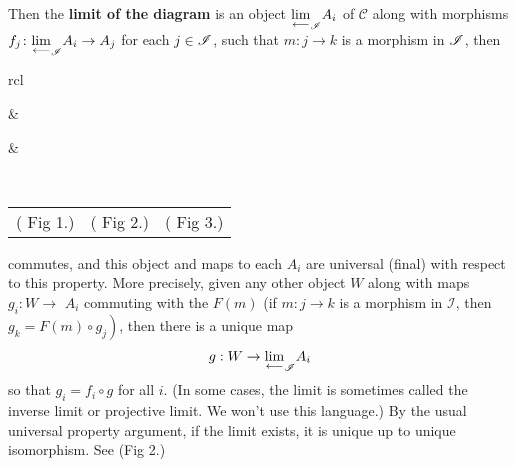 Then the \textbf{limit of the diagram} is an object ${\lim\limits_{\longleftarrow}}_{{\mathscr I}} A_i$ of $\mathscr{C}$ along with morphisms
$f_j\colon {\lim\limits_{\longleftarrow}}_{{\mathscr I}} A_i\to A_j$ for each $j\in {\mathscr I}$, such that $m\colon j\to k$ is a morphism in ${\mathscr I}$, then 
\begin{center}
\begin{tabular}{rcl}
&  
&
\end{tabular}\\
\begin{tabular}{p{.3\linewidth}<{\centering} p{.3\linewidth}<{\centering} p{.3\linewidth}<{\raggedright}}
( Fig 1.) & ( Fig 2.) & \hspace{2.5em}( Fig 3.)
\end{tabular}
  \end{center}
commutes, and this object and maps to each $A_i$ are universal (final) with respect to this property. More precisely, given any other object $W$ along with maps $g_i: W \rightarrow$ $A_i$ commuting with the $F(m)$ (if $m: j \rightarrow k$ is a morphism in $\mathscr{I}$, then $\left.g_k=F(m) \circ g_j\right)$, then there is a unique map
\begin{align*}
g: W \rightarrow {\lim\limits_{\longleftarrow}}_{{\mathscr I}} A_i
\end{align*}
so that $g_i=f_i \circ g$ for all $i$. (In some cases, the limit is sometimes called the inverse limit or projective limit. We won't use this language.) By the usual universal property argument, if the limit exists, it is unique up to unique isomorphism. See (Fig 2.)

